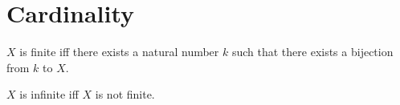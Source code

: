 \section{Cardinality}





\begin{definition}\label{finite}
    $X$ is finite iff there exists a natural number $k$ such that
        there exists a bijection from $k$ to $X$.
\end{definition}

\begin{abbreviation}\label{infinite}
    $X$ is infinite iff $X$ is not finite.
\end{abbreviation}
